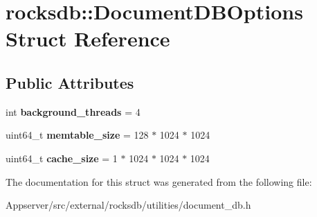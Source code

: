 \hypertarget{structrocksdb_1_1DocumentDBOptions}{}\section{rocksdb\+:\+:Document\+D\+B\+Options Struct Reference}
\label{structrocksdb_1_1DocumentDBOptions}
\subsection*{Public Attributes}
\begin{DoxyCompactItemize}
\item 
int {\bfseries background\+\_\+threads} = 4\hypertarget{structrocksdb_1_1DocumentDBOptions_a331eba3ecd8ad3d389ab380f352275ea}{}\label{structrocksdb_1_1DocumentDBOptions_a331eba3ecd8ad3d389ab380f352275ea}

\item 
uint64\+\_\+t {\bfseries memtable\+\_\+size} = 128 $\ast$ 1024 $\ast$ 1024\hypertarget{structrocksdb_1_1DocumentDBOptions_a1e67baa739b6f470790606ba1d86579e}{}\label{structrocksdb_1_1DocumentDBOptions_a1e67baa739b6f470790606ba1d86579e}

\item 
uint64\+\_\+t {\bfseries cache\+\_\+size} = 1 $\ast$ 1024 $\ast$ 1024 $\ast$ 1024\hypertarget{structrocksdb_1_1DocumentDBOptions_a967bc30f79f44d6d7cf1004513b6dd2d}{}\label{structrocksdb_1_1DocumentDBOptions_a967bc30f79f44d6d7cf1004513b6dd2d}

\end{DoxyCompactItemize}


The documentation for this struct was generated from the following file\+:\begin{DoxyCompactItemize}
\item 
Appserver/src/external/rocksdb/utilities/document\+\_\+db.\+h\end{DoxyCompactItemize}
